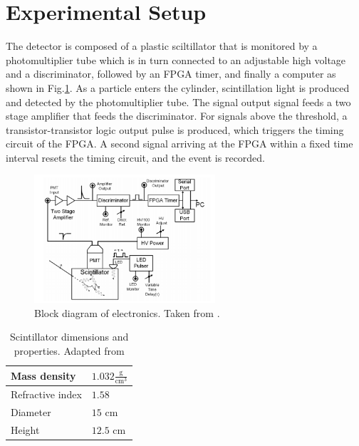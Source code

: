 \documentclass[12pt]{article}
\begin{document}
\section{Experimental Setup}
The detector is composed of a plastic sciltillator that is monitored by a photomultiplier tube which is in turn connected to an adjustable high voltage and a discriminator, followed by an FPGA timer, and finally a computer as shown in Fig.\ref{fig:electronics}. As a particle enters the cylinder, scintillation light is produced and detected by the photomultiplier tube.  The signal output signal feeds a two stage amplifier that feeds the discriminator. For signals above the threshold, a transistor-transistor logic output pulse is produced, which triggers the timing circuit of the FPGA. A second signal arriving at the FPGA within a fixed time interval resets the timing circuit, and the event is recorded. 

\begin{figure}[h]
\begin{center}
 \quad \includegraphics[width=0.6\textwidth]{electronics}
\end{center}
\caption{Block diagram of electronics. Taken from \cite{manual}.}
\label{fig:electronics}
\end{figure}
\begin{table}[htbp]\centering
\begin{tabular}{ |p{3cm}|p{3cm}|}
 \hline
  Mass density & \qquad $1.032 \frac{\text{g}}{\text{cm}^3}$\\
 \hline
Refractive index & \qquad $1.58$\\
\hline
 Diameter & \qquad $15$ cm\\
 \hline
 Height & \qquad $12.5$ cm\\
 \hline
\end{tabular}
\def\sym#1{\ifmmode^{#1}\else\(^{#1}\)\fi}
\caption{Scintillator dimensions and properties. Adapted from \cite{manual}}
\label{tab:scintillator}
\end{table}
\end{document}
